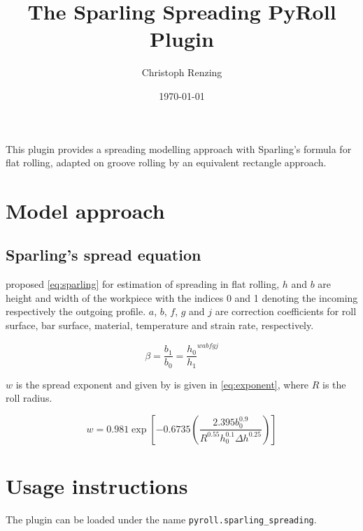 \documentclass[11pt]{PyRollDocs}
\begin{document}
    \title{The Sparling Spreading PyRoll Plugin}
    \author{Christoph Renzing}
    \date{\today}

    \maketitle

    This plugin provides a spreading modelling approach with Sparling's formula for flat rolling, adapted on groove rolling by an equivalent rectangle approach.


    \section{Model approach}\label{sec:model-approach}

    \subsection{Sparling's spread equation}\label{subsec:sparling's-spread-equation}

    \textcite{Sparling1961} proposed \autoref{eq:sparling} for estimation of spreading in flat rolling,
    $h$ and $b$ are height and width of the workpiece with the indices 0 and 1 denoting the incoming respectively the outgoing profile.
    $a$, $b$, $f$, $g$ and $j$ are correction coefficients for roll surface, bar surface, material, temperature and strain rate, respectively.

    \begin{equation}
        \beta = \frac{b_1}{b_0} =  \frac{h_0}{h_1} ^{w a b f g j}
        \label{eq:sparling}
    \end{equation}


    $w$ is the spread exponent and given by \textcite{Sparling1961} is given in \autoref{eq:exponent}, where $R$ is the roll radius.

    \begin{equation}
        w = 0.981 \exp \left[ -0.6735 \left( \frac{2.395 b_0^{0.9}}{R^{0.55} h_0^{0.1} \Delta h^{0.25} } \right) \right]
        \label{eq:exponent}
    \end{equation}


    \section{Usage instructions}\label{sec:usage-instructions}

    The plugin can be loaded under the name \texttt{pyroll.sparling\_spreading}.
\end{document}
